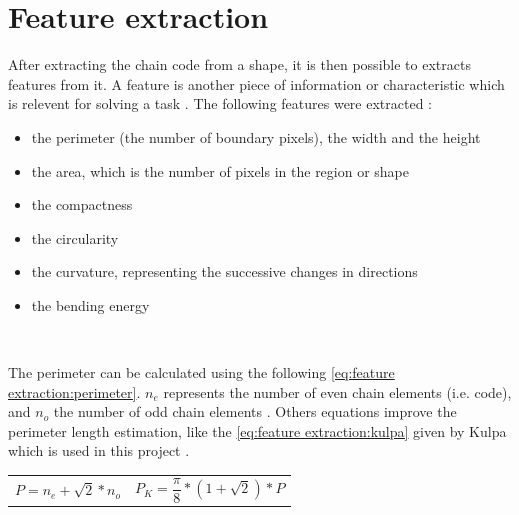 



\section{Feature extraction}

After extracting the chain code from a shape, it is then possible to extracts features from it. A feature is another piece of information or characteristic which is relevent for solving a task \cite{bib:extraction:definition}. The following features were extracted : 
\begin{itemize}
	\item the perimeter (the number of boundary pixels), the width and the height
	\item the area, which is the number of pixels in the region or shape 
	\item the compactness 
	\item the circularity 
	\item the curvature, representing the successive changes in directions 
	\item the bending energy 
\end{itemize}

~~ 

The perimeter can be calculated using the following \vref{eq:feature extraction:perimeter}. $n_e$ represents the number of even chain elements (i.e. code), and $n_o$ the number of odd chain elements \cite{bib:chain:EstimateAreasAndPerimetersChainCode}. Others equations improve the perimeter length estimation, like the \vref{eq:feature extraction:kulpa} given by Kulpa which is used in this project \cite{bib:chain:ObjectDescription}.

\noindent\begin{tabularx}{\textwidth}{@{}XX@{}}
	\begin{equation} \label{eq:feature extraction:perimeter}
		P = n_e + \sqrt{2}*n_o 
	\end{equation} & 
	\begin{equation} \label{eq:feature extraction:kulpa}
		P_K = \frac{\pi}{8} * (1 + \sqrt{2}) * P 
	\end{equation}
\end{tabularx}


